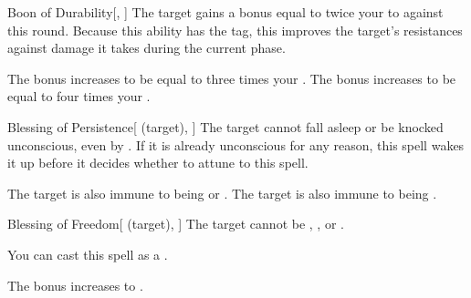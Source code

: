 \lowercase{\hypertarget{spell:Boon of Durability}{}}\label{spell:Boon of Durability}
\begin{freeability}[Rank 3]{\hypertarget{spell:Boon of Durability}{Boon of Durability}}[, ]
The target gains a bonus equal to twice your  to  against  this round.
Because this ability has the  tag, this improves the target's resistances against damage it takes during the current phase.

\rankline
{} The bonus increases to be equal to three times your .
 The bonus increases to be equal to four times your .
\end{freeability}
\vspace{0.25em}



\lowercase{\hypertarget{spell:Blessing of Persistence}{}}\label{spell:Blessing of Persistence}
\begin{attuneability}[Rank 4]{\hypertarget{spell:Blessing of Persistence}{Blessing of Persistence}}[ (target), ]
The target cannot fall asleep or be knocked unconscious, even by .
If it is already unconscious for any reason, this spell wakes it up before it decides whether to attune to this spell.


\rankline
{} The target is also immune to being  or .
 The target is also immune to being .
\end{attuneability}
\vspace{0.25em}



\lowercase{\hypertarget{spell:Blessing of Freedom}{}}\label{spell:Blessing of Freedom}
\begin{attuneability}[Rank 5]{\hypertarget{spell:Blessing of Freedom}{Blessing of Freedom}}[ (target), ]
The target cannot be , , or .

You can cast this spell as a .

\rankline
{} The bonus increases to .
\end{attuneability}
\vspace{0.25em}



